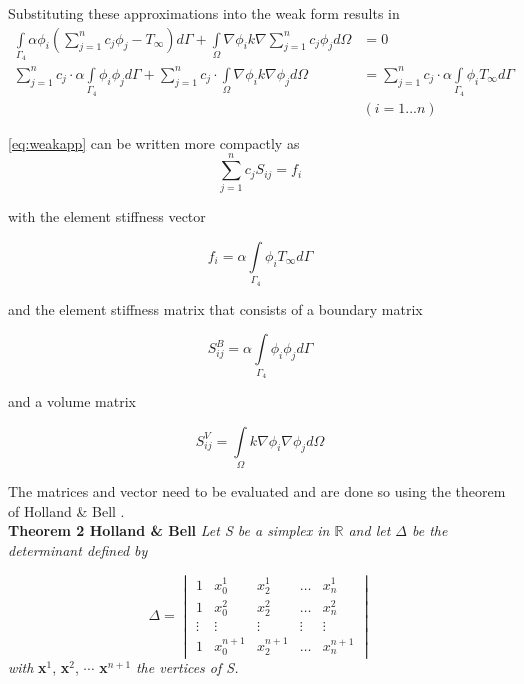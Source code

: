 \documentclass[10pt,a4paper]{article}
\begin{document}
Substituting these approximations into the weak form results in 
\begin{align}\label{eq:weakapp}
\underset{\Gamma_4}{\int} \alpha \phi_i  \left(\displaystyle\sum^n_{j=1} c_j \phi_j - T_{\infty}\right)d\Gamma + \underset{\Omega}{\int}\nabla \phi_i k \nabla \displaystyle\sum^n_{j=1} c_j \phi_j d\Omega &=0\nonumber\\
\displaystyle\sum^n_{j=1} c_j \cdot \alpha\underset{\Gamma_4}{\int}  \phi_i  \phi_jd\Gamma + \displaystyle\sum^n_{j=1} c_j \cdot \underset{\Omega}{\int}\nabla \phi_i k \nabla  \phi_j d\Omega &= \displaystyle\sum^n_{j=1} c_j\cdot \alpha\underset{\Gamma_4}{\int} \phi_i T_{\infty}d\Gamma \\
&(i=1...n)\nonumber
\end{align}

\eqref{eq:weakapp} can be written more compactly as 
\begin{equation*}
\displaystyle\sum^n_{j=1} c_j S_{ij} = f_i
\end{equation*}

with the element stiffness vector 

\begin{equation*}
f_i =\alpha\underset{\Gamma_4}{\int} \phi_i T_{\infty}d\Gamma 
\end{equation*}

and the element stiffness matrix that consists of a boundary matrix 

\begin{equation*}
S^{B}_{ij} = \alpha\underset{\Gamma_4}{\int}  \phi_i  \phi_jd\Gamma 
\end{equation*}

 and a volume matrix
 
\begin{equation*}
 S^V_{ij} = \underset{\Omega}{\int}k\nabla \phi_i  \nabla  \phi_j d\Omega
\end{equation*}
 
The matrices and vector need to be evaluated and are done so using the theorem of  Holland \& Bell .\\

\textbf{Theorem 2 Holland \& Bell} \textit{Let S be a simplex in $\mathbb{R}$ and let $\Delta$ be the determinant defined by }

\begin{equation*}\label{eq:det1}
\Delta = \begin{vmatrix}
1		& x^1_{0} 		& x^1_{2} 		& \dots 	& x^1_{n}\\
1		& x^2_{0} 		& x^2_{2} 		& \dots 	& x^2_{n}\\
\vdots	& \vdots		& \vdots 		& \vdots	& \vdots \\
1		& x^{n+1}_{0} 	& x^{n+1}_{2} 	& \dots 	& x^{n+1}_{n}
\end{vmatrix}
\end{equation*}
\textit{with} \textbf{x}$^1$, \textbf{x}$^2$, $\cdots$ \textbf{x}$^{n+1}$ \textit{the vertices of S.}\\
\end{document}
